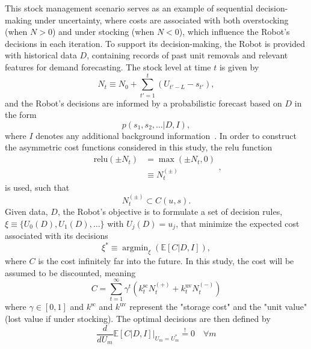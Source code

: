 \documentclass[a4paper,12pt]{article}
\DeclareMathOperator*{\argmin}{argmin}
\theoremstyle{definition}
\begin{document}
	This stock management scenario serves as an example of sequential decision-making under uncertainty, where costs are associated with both overstocking (when $N > 0$) and under stocking (when $N < 0$), which influence the Robot's decisions in each iteration. To support its decision-making, the Robot is provided with historical data $D$, containing records of past unit removals and relevant features for demand forecasting. The stock level at time $t$ is given by  
	\begin{equation}
		N_t \equiv N_0 + \sum_{t'=1}^{t} (U_{t'-L} - s_{t'}),
	\end{equation}
	and the Robot's decisions are informed by a probabilistic forecast based on $D$ in the form  
	\begin{equation}
		p(s_1, s_2, \dots | D, I),
		\label{eq:prob_forecast}
	\end{equation}
	where $I$ denotes any additional background information~\citep{Sivia2006}. In order to construct the asymmetric cost functions considered in this study, the relu function
	\begin{equation}
		\begin{split}
			\text{relu}(\pm N_t) &= \max(\pm N_t,0)\\
			&\equiv N_t^{(\pm)}
		\end{split},
	\end{equation}
	is used, such that
	\begin{equation}
		N_t^{(\pm)}\subset C(u,s).
	\end{equation}
	Given data, $D$, the Robot's objective is to formulate a set of decision rules, $\xi\equiv \{U_0(D),U_1(D),\dots\}$ with  $U_j(D)=u_j$, that minimize the expected cost associated with its decisions
	\begin{equation}
		\xi^*\equiv \argmin_{\xi}(\mathbb{E}[C|D,I]),
	\end{equation}
	where $C$ is the cost infinitely far into the future. In this study, the cost will be assumed to be discounted, meaning
	\begin{equation}
		C = \sum_{t=1}^{\infty}\gamma^{t}(k^\text{sc}_{t}N_{t}^{(+)}+k_{t}^\text{uv}N_{t}^{(-)})
	\end{equation}
	where $\gamma\in [0,1]$ and $k^\text{sc}$ and $k^\text{uv}$ represent the "storage cost" and the "unit value" (lost value if under stocking). The optimal decisions are then defined by
	\begin{equation}
		\frac{d}{dU_m}\mathbb{E}[C|D,I]\bigg|_{U_m = U_m^*} \overset{!}{=} 0\quad \forall m
		\label{eq:min_exp_cost}
	\end{equation}
\end{document}
